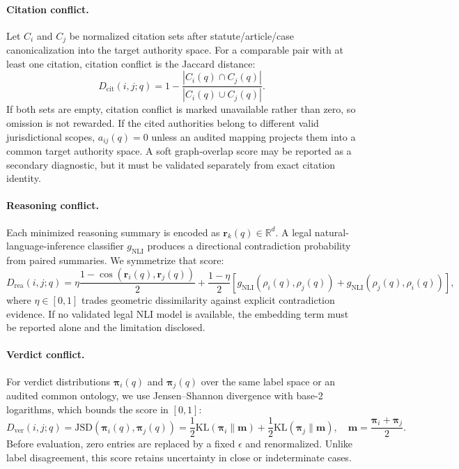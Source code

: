 \documentclass[preprint,12pt,authoryear]{elsarticle}
\newcommand{\jsd}{\mathrm{JSD}}
\newcommand{\KL}{\mathrm{KL}}
\begin{document}
\paragraph{Citation conflict.}
Let $C_i$ and $C_j$ be normalized citation sets after statute/article/case canonicalization into the target authority space. For a comparable pair with at least one citation, citation conflict is the Jaccard distance:
\begin{equation}
    D_{\mathrm{cit}}(i,j;q) =
    1 - \dfrac{|C_i(q) \cap C_j(q)|}{|C_i(q) \cup C_j(q)|}.
\end{equation}
If both sets are empty, citation conflict is marked unavailable rather than zero, so omission is not rewarded. If the cited authorities belong to different valid jurisdictional scopes, $a_{ij}(q)=0$ unless an audited mapping projects them into a common target authority space. A soft graph-overlap score may be reported as a secondary diagnostic, but it must be validated separately from exact citation identity.

\paragraph{Reasoning conflict.}
Each minimized reasoning summary is encoded as $\bm{r}_k(q) \in \mathbb{R}^{d}$. A legal natural-language-inference classifier $g_{\mathrm{NLI}}$ produces a directional contradiction probability from paired summaries. We symmetrize that score:
\begin{equation}
    D_{\mathrm{rea}}(i,j;q) =
    \eta \frac{1 - \cos(\bm{r}_i(q),\bm{r}_j(q))}{2}
    + \frac{1-\eta}{2}\left[
    g_{\mathrm{NLI}}(\rho_i(q),\rho_j(q))
    + g_{\mathrm{NLI}}(\rho_j(q),\rho_i(q))\right],
\end{equation}
where $\eta\in[0,1]$ trades geometric dissimilarity against explicit contradiction evidence. If no validated legal NLI model is available, the embedding term must be reported alone and the limitation disclosed.

\paragraph{Verdict conflict.}
For verdict distributions $\bm{\pi}_i(q)$ and $\bm{\pi}_j(q)$ over the same label space or an audited common ontology, we use Jensen--Shannon divergence with base-2 logarithms, which bounds the score in $[0,1]$:
\begin{equation}
    D_{\mathrm{ver}}(i,j;q) =
    \jsd(\bm{\pi}_i(q),\bm{\pi}_j(q))
    = \frac{1}{2}\KL(\bm{\pi}_i \| \bm{m})
    + \frac{1}{2}\KL(\bm{\pi}_j \| \bm{m}),
    \quad \bm{m}=\frac{\bm{\pi}_i+\bm{\pi}_j}{2}.
\end{equation}
Before evaluation, zero entries are replaced by a fixed $\epsilon$ and renormalized. Unlike label disagreement, this score retains uncertainty in close or indeterminate cases.
\end{document}
